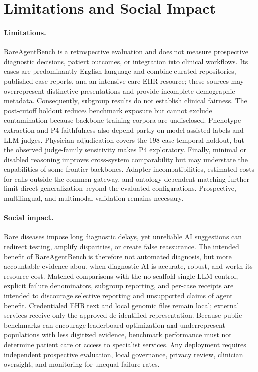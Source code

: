 \documentclass[letterpaper]{article} %
\begin{document}



\section{Limitations and Social Impact}
\label{sec-9}

\paragraph{Limitations.}
RareAgentBench is a retrospective evaluation and does not measure prospective
diagnostic decisions, patient outcomes, or integration into clinical
workflows. Its cases are predominantly English-language and combine curated
repositories, published case reports, and an intensive-care EHR resource;
these sources may overrepresent distinctive presentations and provide
incomplete demographic metadata. Consequently, subgroup results do not
establish clinical fairness. The post-cutoff holdout reduces benchmark
exposure but cannot exclude contamination because backbone training corpora
are undisclosed. Phenotype extraction and P4 faithfulness also depend partly
on model-assisted labels and LLM judges. Physician adjudication covers the
198-case temporal holdout, but the observed judge-family sensitivity makes P4
exploratory. Finally, minimal or disabled reasoning improves cross-system
comparability but may understate the capabilities of some frontier backbones.
Adapter incompatibilities, estimated costs for calls outside the common
gateway, and ontology-dependent matching further limit direct generalization
beyond the evaluated configurations. Prospective, multilingual, and
multimodal validation remains necessary.

\paragraph{Social impact.}
Rare diseases impose long diagnostic delays, yet unreliable AI suggestions
can redirect testing, amplify disparities, or create false reassurance. The
intended benefit of RareAgentBench is therefore not automated diagnosis, but
more accountable evidence about when diagnostic AI is accurate, robust, and
worth its resource cost. Matched comparisons with the no-scaffold single-LLM
control, explicit failure denominators, subgroup reporting, and per-case
receipts are intended to discourage selective reporting and unsupported
claims of agent benefit. Credentialed EHR text and local genomic files remain
local; external services receive only the approved de-identified
representation. Because public benchmarks can encourage leaderboard
optimization and underrepresent populations with less digitized evidence,
benchmark performance must not determine patient care or access to specialist
services. Any deployment requires independent prospective evaluation, local
governance, privacy review, clinician oversight, and monitoring for unequal
failure rates.
\end{document}
